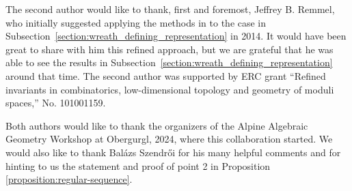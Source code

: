 \documentclass[a4paper,12pt]{amsart}
\theoremstyle{plain}
\theoremstyle{definition}
\theoremstyle{remark}
\begin{document}
The second author would like to thank, first and foremost, Jeffrey B. Remmel, who initially suggested applying the methods in \cite{MendesRomero} to the case in Subsection~\ref{section:wreath_defining_representation} in 2014.
It would have been great to share with him this refined approach, but we are grateful that he was able to see the results in Subsection~\ref{section:wreath_defining_representation} around that time.
The second author was supported by ERC grant “Refined invariants in combinatorics, low-dimensional topology
and geometry of moduli spaces,” No. 101001159.

Both authors would like to thank the organizers of the Alpine Algebraic Geometry Workshop at Obergurgl, 2024, where this collaboration started. We would also like to thank Bal\'{a}zs Szendr\H{o}i for his many helpful comments and for hinting to us the statement and proof of point 2 in Proposition \ref{proposition:regular-sequence}.



\end{document}

